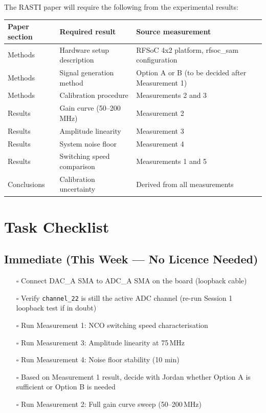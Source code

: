 \documentclass[11pt,a4paper]{article}
\begin{document}
The RASTI paper will require the following from the experimental results:

\begin{center}
\begin{longtable}{L{3.5cm} L{4cm} L{5cm}}
\toprule
\textbf{Paper section} & \textbf{Required result} & \textbf{Source measurement} \\
\midrule
Methods & Hardware setup description & RFSoC 4x2 platform, rfsoc\_sam configuration \\
Methods & Signal generation method & Option A or B (to be decided after Measurement 1) \\
Methods & Calibration procedure & Measurements 2 and 3 \\
Results & Gain curve (50--200\,MHz) & Measurement 2 \\
Results & Amplitude linearity & Measurement 3 \\
Results & System noise floor & Measurement 4 \\
Results & Switching speed comparison & Measurements 1 and 5 \\
Conclusions & Calibration uncertainty & Derived from all measurements \\
\bottomrule
\end{longtable}
\end{center}

\section{Task Checklist}

\subsection{Immediate (This Week --- No Licence Needed)}

\begin{itemize}[leftmargin=2em,itemsep=4pt]
  \item[$\square$] Connect DAC\_A SMA to ADC\_A SMA on the board (loopback cable)
  \item[$\square$] Verify \texttt{channel\_22} is still the active ADC channel
        (re-run Session 1 loopback test if in doubt)
  \item[$\square$] Run Measurement 1: NCO switching speed characterisation
  \item[$\square$] Run Measurement 3: Amplitude linearity at 75\,MHz
  \item[$\square$] Run Measurement 4: Noise floor stability (10 min)
  \item[$\square$] Based on Measurement 1 result, decide with Jordan whether
        Option A is sufficient or Option B is needed
  \item[$\square$] Run Measurement 2: Full gain curve sweep (50--200\,MHz)
\end{itemize}
\end{document}
